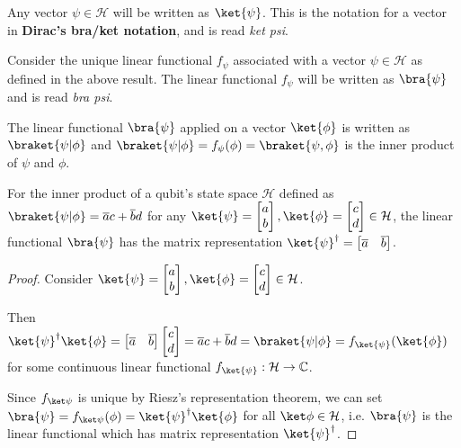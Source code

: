 \begin{note}
    Any vector $\psi \in \mathcal{H}$ will be written as $\ket{\psi}$. This is the notation for a vector in \textbf{Dirac's bra/ket notation}, and is read \textit{ket psi}.

    Consider the unique linear functional $f_\psi$ associated with a vector $\psi \in \mathcal{H}$ as defined in the above result. The linear functional $f_\psi$ will be written as $\bra{\psi}$ and is read \textit{bra psi}.

    The linear functional $\bra{\psi}$ applied on a vector $\ket{\phi}$ is written as $\braket{\psi|\phi}$ and $\braket{\psi|\phi} = f_\psi(\phi) = \braket{\psi,\phi}$ is the inner product of $\psi$ and $\phi$.
\end{note}

\begin{thm}
    For the inner product of a qubit's state space $\mathcal{H}$ defined as $\braket{\psi|\phi} = \overline{a} c + \overline{b} d$ for any $\ket{\psi} = \begin{bmatrix} a \\ b\end{bmatrix}, \ket{\phi} = \begin{bmatrix} c \\ d \end{bmatrix} \in \mathcal{H}$, the linear functional $\bra{\psi}$ has the matrix representation $\ket{\psi}^\dagger = \begin{bmatrix} \overline{a} & \overline{b} \end{bmatrix}$. 
\end{thm}
\begin{proof}

    Consider $\ket{\psi} = \begin{bmatrix} a \\ b\end{bmatrix}, \ket{\phi} = \begin{bmatrix} c \\ d \end{bmatrix} \in \mathcal{H}$.

        Then $\ket{\psi}^\dagger \ket{\phi} = \begin{bmatrix}\overline{a} & \overline{b} \end{bmatrix}  \begin{bmatrix} c \\ d \end{bmatrix} = \overline{a} c + \overline{b} d = \braket{\psi|\phi} = f_{\ket{\psi}}(\ket{\phi})$ for some continuous linear functional $f_{\ket{\psi}}: \mathcal{H} \to \mathbb{C}$.

            Since $f_{\ket\psi}$ is unique by Riesz's representation theorem, we can set $\bra{\psi} = f_{\ket\psi}(\phi) = \ket{\psi}^\dagger \ket{\phi}$ for all $\ket\phi \in \mathcal{H}$, i.e. $\bra{\psi}$ is the linear functional which has matrix representation $\ket{\psi}^\dagger$.
\end{proof}
